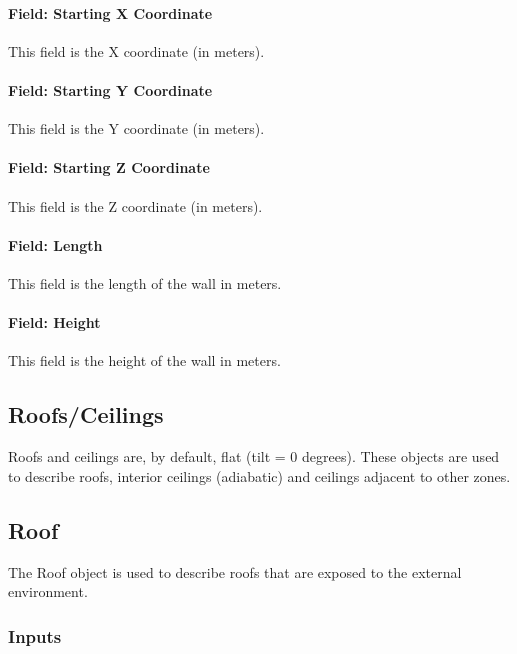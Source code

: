 \paragraph{Field: Starting X Coordinate}\label{field-starting-x-coordinate-3}

This field is the X coordinate (in meters).

\paragraph{Field: Starting Y Coordinate}\label{field-starting-y-coordinate-3}

This field is the Y coordinate (in meters).

\paragraph{Field: Starting Z Coordinate}\label{field-starting-z-coordinate-3}

This field is the Z coordinate (in meters).

\paragraph{Field: Length}\label{field-length-3}

This field is the length of the wall in meters.

\paragraph{Field: Height}\label{field-height-3}

This field is the height of the wall in meters.

\subsection{Roofs/Ceilings}\label{roofsceilings}

Roofs and ceilings are, by default, flat (tilt = 0 degrees). These objects are used to describe roofs, interior ceilings (adiabatic) and ceilings adjacent to other zones.

\subsection{Roof}\label{roof}

The Roof object is used to describe roofs that are exposed to the external environment.

\subsubsection{Inputs}\label{inputs-8-026}

